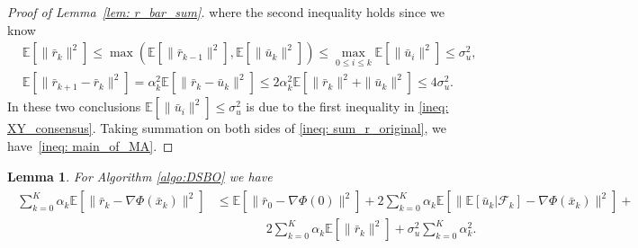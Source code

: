 \documentclass{article}
\theoremstyle{plain}
\newtheorem{lemma}[theorem]{Lemma}
\theoremstyle{definition}
\theoremstyle{remark}
\newcommand{\E}{\mathbb{E}}
\newcommand{\F}{\mathcal{F}}
\begin{document}
\begin{proof}[Proof of Lemma~\ref{lem: r_bar_sum}]
where the second inequality holds since we know
\begin{align*}
    &\E\left[\|\bar{r}_k\|^2\right]\leq \max\left(\E\left[\|\bar{r}_{k-1}\|^2\right], \E\left[\|\bar{u}_k\|^2\right]\right)\leq \max_{0\leq i\leq k}\E\left[\|\bar{u}_i\|^2\right]\leq \sigma_u^2, \\
    &\E\left[\|\bar{r}_{k+1} - \bar{r}_k\|^2\right] = \alpha_k^2\E\left[\|\bar{r}_k - \bar{u}_k\|^2\right]\leq 2\alpha_k^2\E\left[\|\bar{r}_k\|^2 + \|\bar{u}_k\|^2\right]\leq 4\sigma_u^2.
\end{align*}
In these two conclusions $\E\left[\|\bar{u}_i\|^2\right]\leq \sigma_u^2$ is due to the first inequality in \eqref{ineq: XY_consensus}. Taking summation on both sides of \eqref{ineq: sum_r_original}, we have~\eqref{ineq: main_of_MA}.
\end{proof}



\begin{lemma}\label{lem: r_and_grad}
    For Algorithm \ref{algo:DSBO} we have
    \begin{align}\label{eq:temp}
    \begin{aligned}
        \sum_{k=0}^{K}\alpha_k\E\left[\|\bar{r}_k -\nabla\Phi(\bar{x}_k)\|^2\right]&\leq \E\left[\|\bar{r}_0 - \nabla\Phi(0)\|^2\right] + 2\sum_{k=0}^{K}\alpha_k\E\left[\|\E\left[\bar{u}_k|\F_k\right] - \nabla\Phi(\bar{x}_k)\|^2\right] + \\
        &\qquad \qquad 2\sum_{k=0}^{K}\alpha_k\E\left[\|\bar{r}_k\|^2\right] + \sigma_u^2\sum_{k=0}^{K}\alpha_k^2.
        \end{aligned}
    \end{align}
\end{lemma}
\end{document}

